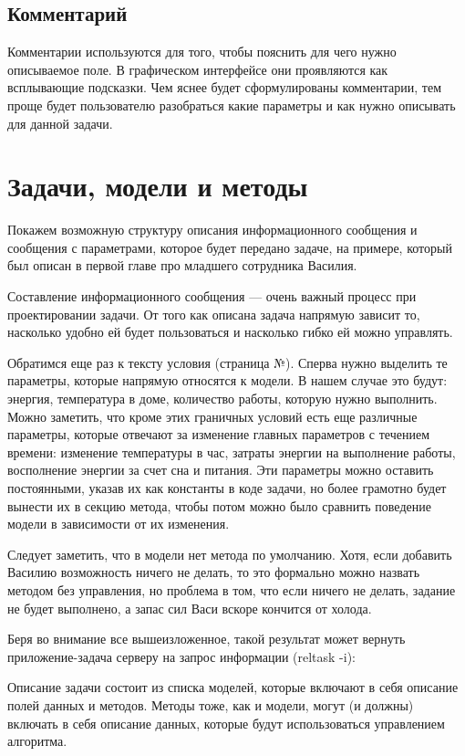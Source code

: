{{\subsection{Комментарий}

Комментарии используются для того, чтобы пояснить для чего нужно описываемое поле. В графическом интерфейсе они проявляются как всплывающие подсказки. Чем яснее будет сформулированы комментарии, тем проще будет пользователю разобраться какие параметры и как нужно описывать для данной задачи.

\section{Задачи, модели и методы}
Покажем возможную структуру описания информационного сообщения и сообщения с параметрами, которое будет передано задаче, на примере, который был описан в первой главе про младшего сотрудника Василия.

Составление информационного сообщения — очень важный процесс при проектировании задачи. От того как описана задача напрямую зависит то, насколько удобно ей будет пользоваться и насколько гибко ей можно управлять.

Обратимся еще раз к тексту условия (страница №). Сперва нужно выделить те параметры, которые напрямую относятся к модели. В нашем случае это будут: энергия, температура в доме, количество работы, которую нужно выполнить. Можно заметить, что кроме этих граничных условий есть еще различные параметры, которые отвечают за изменение главных параметров с течением времени: изменение температуры в час, затраты энергии на выполнение работы, восполнение энергии за счет сна и питания. 
Эти параметры можно оставить постоянными, указав их как константы в коде задачи, но более грамотно будет вынести их в секцию метода, чтобы потом можно было сравнить поведение модели в зависимости от их изменения.

Следует заметить, что в модели нет метода по умолчанию. Хотя, если добавить Василию возможность ничего не делать, то это формально можно назвать методом без управления, но проблема в том, что если ничего не делать, задание не будет выполнено, а запас сил Васи вскоре кончится от холода.

Беря во внимание все вышеизложенное, такой результат может вернуть приложение-задача серверу на запрос информации (reltask -i):



Описание задачи состоит из списка моделей, которые включают в себя описание полей данных и методов. Методы тоже, как и модели, могут (и должны) включать в себя описание данных, которые будут использоваться управлением алгоритма.

}}
